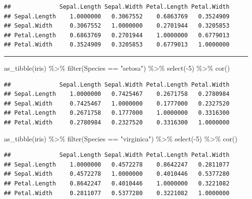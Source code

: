 \documentclass[
]{article}
\newenvironment{Shaded}{\begin{snugshade}}{\end{snugshade}}
\newcommand{\DecValTok}[1]{\textcolor[rgb]{0.00,0.00,0.81}{#1}}
\newcommand{\FunctionTok}[1]{\textcolor[rgb]{0.00,0.00,0.00}{#1}}
\newcommand{\NormalTok}[1]{#1}
\newcommand{\SpecialCharTok}[1]{\textcolor[rgb]{0.00,0.00,0.00}{#1}}
\newcommand{\StringTok}[1]{\textcolor[rgb]{0.31,0.60,0.02}{#1}}
\begin{document}
\begin{verbatim}
##              Sepal.Length Sepal.Width Petal.Length Petal.Width
## Sepal.Length    1.0000000   0.3067552    0.6863769   0.3524909
## Sepal.Width     0.3067552   1.0000000    0.2701944   0.3205853
## Petal.Length    0.6863769   0.2701944    1.0000000   0.6779013
## Petal.Width     0.3524909   0.3205853    0.6779013   1.0000000
\end{verbatim}

\begin{center}\rule{0.5\linewidth}{0.5pt}\end{center}

\begin{Shaded}
\begin{Highlighting}[]
\FunctionTok{as\_tibble}\NormalTok{(iris) }\SpecialCharTok{\%\textgreater{}\%} \FunctionTok{filter}\NormalTok{(Species }\SpecialCharTok{==} \StringTok{"setosa"}\NormalTok{) }\SpecialCharTok{\%\textgreater{}\%} \FunctionTok{select}\NormalTok{(}\SpecialCharTok{{-}}\DecValTok{5}\NormalTok{) }\SpecialCharTok{\%\textgreater{}\%} \FunctionTok{cor}\NormalTok{()}
\end{Highlighting}
\end{Shaded}

\begin{verbatim}
##              Sepal.Length Sepal.Width Petal.Length Petal.Width
## Sepal.Length    1.0000000   0.7425467    0.2671758   0.2780984
## Sepal.Width     0.7425467   1.0000000    0.1777000   0.2327520
## Petal.Length    0.2671758   0.1777000    1.0000000   0.3316300
## Petal.Width     0.2780984   0.2327520    0.3316300   1.0000000
\end{verbatim}

\begin{Shaded}
\begin{Highlighting}[]
\FunctionTok{as\_tibble}\NormalTok{(iris) }\SpecialCharTok{\%\textgreater{}\%} \FunctionTok{filter}\NormalTok{(Species }\SpecialCharTok{==} \StringTok{"virginica"}\NormalTok{) }\SpecialCharTok{\%\textgreater{}\%} \FunctionTok{select}\NormalTok{(}\SpecialCharTok{{-}}\DecValTok{5}\NormalTok{) }\SpecialCharTok{\%\textgreater{}\%} \FunctionTok{cor}\NormalTok{()}
\end{Highlighting}
\end{Shaded}

\begin{verbatim}
##              Sepal.Length Sepal.Width Petal.Length Petal.Width
## Sepal.Length    1.0000000   0.4572278    0.8642247   0.2811077
## Sepal.Width     0.4572278   1.0000000    0.4010446   0.5377280
## Petal.Length    0.8642247   0.4010446    1.0000000   0.3221082
## Petal.Width     0.2811077   0.5377280    0.3221082   1.0000000
\end{verbatim}
\end{document}
